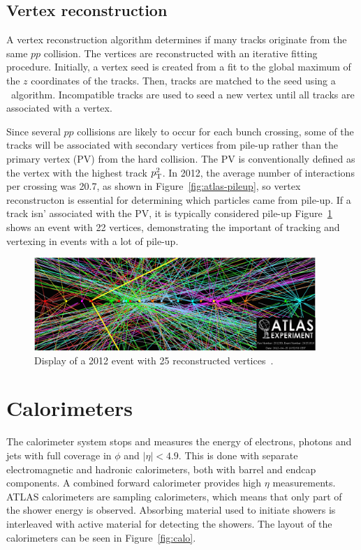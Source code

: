 \subsection{Vertex reconstruction}
A vertex reconstruction algorithm determines if many tracks originate from the same $pp$ collision\cite{ATLAS-CONF-2010-069,ATLAS-CONF-2012-042}. The vertices are reconstructed with an iterative fitting procedure. Initially, a vertex seed is created from a fit to the global maximum of the $z$ coordinates of the tracks. Then, tracks are matched to the seed using a \chisq\ algorithm. Incompatible tracks are used to seed a new vertex until all tracks are associated with a vertex.

Since several $pp$ collisions are likely to occur for each bunch crossing, some of the tracks will be associated with secondary vertices from pile-up rather than the primary vertex (PV) from the hard collision. The PV is conventionally defined as the vertex with the highest track $p_{\text{T}}^2$. In 2012, the average number of interactions per crossing was 20.7, as shown in Figure~\ref{fig:atlas-pileup}, so vertex reconstructon is essential for determining which particles came from pile-up. If a track isn' associated with the PV, it is typically considered pile-up Figure~\ref{fig:disppileup} shows an event with 22 vertices, demonstrating the important of tracking and vertexing in events with a lot of pile-up.


\begin{figure}[tp]
  \centering
  \includegraphics[width=0.95\textwidth]{fig/atlas/pileupEvent}
  \caption{Display of a 2012 event with 25 reconstructed vertices~\cite{eventdisp}.}
  \label{fig:disppileup}
\end{figure}

\section{Calorimeters}
The calorimeter system  stops and measures the energy of electrons, photons and jets with full coverage in $\phi$ and $|\eta|<4.9$. This is done with separate electromagnetic and hadronic calorimeters, both with barrel and endcap components. A combined forward calorimeter provides high $\eta$ measurements. ATLAS calorimeters are sampling calorimeters, which means that only part of the shower energy is observed. Absorbing material used to initiate showers is interleaved with active material for detecting the showers. The layout of the calorimeters can be seen in Figure~\ref{fig:calo}. 

